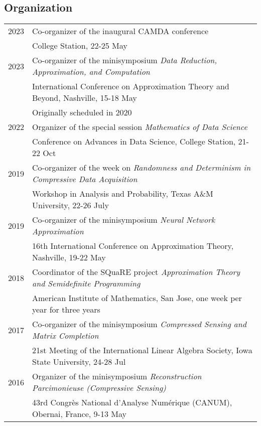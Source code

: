 \documentclass[11pt]{article}
\begin{document}
\subsection{Organization}

\begin{tabular}{ll}
2023\phantom{-??} & Co-organizer of the inaugural CAMDA conference\\
& College Station, 22-25 May\\
2023 & Co-organizer of the minisymposium {\sl Data Reduction, Approximation, and Computation}\\
& International Conference on Approximation Theory and Beyond, Nashville,  15-18 May\\
& {\small Originally scheduled in 2020}\\
2022 & Organizer of the special session {\em Mathematics of Data Science}\\
& Conference on Advances in Data Science, College Station, 21-22 Oct\\
2019 & Co-organizer of the week on {\sl Randomness and Determinism in Compressive Data Acquisition}\\
& Workshop in Analysis and Probability, Texas A\&M University,  22-26 July\\
2019 & Co-organizer of the minisymposium {\sl Neural Network Approximation}\\
& 16th International Conference on Approximation Theory, Nashville, 19-22 May\\
2018 & Coordinator of the SQuaRE project {\sl Approximation Theory and Semidefinite Programming}\\
& American Institute of Mathematics, San Jose, one week per year for three years\\
2017 & Co-organizer of the minisymposium {\sl Compressed Sensing and Matrix Completion}\\
& 
21st Meeting of the International Linear Algebra Society,
Iowa State University, 24-28 Jul\\
2016 & Organizer of the minisymposium {\sl Reconstruction Parcimonieuse (Compressive Sensing)}\\
& 43rd Congr\`{e}s National d'Analyse Num\'{e}rique (CANUM), Obernai, France, 9-13 May
\end{tabular}
\end{document}
